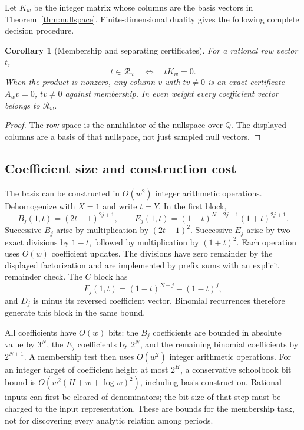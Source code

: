 \documentclass[11pt,a4paper]{article}
\numberwithin{equation}{section}
\newtheorem{corollary}[theorem]{Corollary}
\theoremstyle{definition}\newtheorem{definition}[theorem]{Definition}
\theoremstyle{remark}\newtheorem{remark}[theorem]{Remark}
\newcommand{\Q}{\mathbb Q}
\newcommand{\R}{\mathcal R}
\begin{document}
Let $K_w$ be the integer matrix whose columns are the basis vectors in
Theorem~\ref{thm:nullspace}. Finite-dimensional duality gives the following
complete decision procedure.
\begin{corollary}[Membership and separating certificates]\label{cor:membership}
For a rational row vector $t$,
\begin{equation}
t\in\R_w\quad\Longleftrightarrow\quad tK_w=0.
\label{eq:membership}
\end{equation}
When the product is nonzero, any column $v$ with $tv\ne0$ is an exact
certificate $A_wv=0$, $tv\ne0$ against membership. In even weight every
coefficient vector belongs to $\R_w$.
\end{corollary}
\begin{proof}
The row space is the annihilator of the nullspace over $\Q$. The displayed
columns are a basis of that nullspace, not just sampled null vectors.
\end{proof}

\subsection{Coefficient size and construction cost}
The basis can be constructed in $O(w^2)$ integer arithmetic operations.
Dehomogenize with $X=1$ and write $t=Y$. In the first block,
\[
B_j(1,t)=(2t-1)^{2j+1},\qquad
E_j(1,t)=(1-t)^{N-2j-1}(1+t)^{2j+1}.
\]
Successive $B_j$ arise by multiplication by $(2t-1)^2$. Successive $E_j$
arise by two exact divisions by $1-t$, followed by multiplication by
$(1+t)^2$. Each operation uses $O(w)$ coefficient updates. The divisions
have zero remainder by the displayed factorization and are implemented by
prefix sums with an explicit remainder check. The $C$ block has
\[
F_j(1,t)=(1-t)^{N-j}-(1-t)^j,
\]
and $D_j$ is minus its reversed coefficient vector. Binomial recurrences
therefore generate this block in the same bound.

All coefficients have $O(w)$ bits: the $B_j$ coefficients are bounded in
absolute value by $3^N$, the $E_j$ coefficients by $2^N$, and the remaining
binomial coefficients by $2^{N+1}$. A membership test then uses $O(w^2)$
integer arithmetic operations. For an integer target of coefficient height
at most $2^H$, a conservative schoolbook bit bound is
$O(w^2(H+w+\log w)^2)$, including basis construction. Rational inputs can
first be cleared of denominators; the bit size of that step must be charged
to the input representation. These are bounds for the membership task,
not for discovering every analytic relation among periods.
\end{document}
